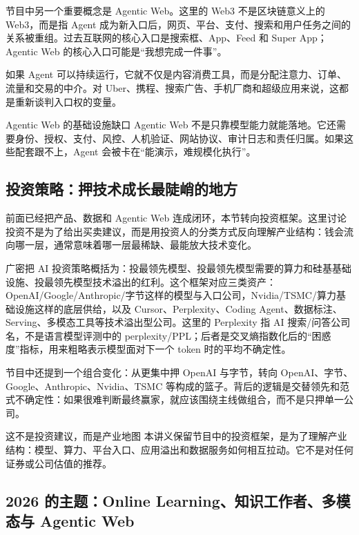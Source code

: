 节目中另一个重要概念是 Agentic Web。这里的 Web3 不是区块链意义上的 Web3，而是指 Agent 成为新入口后，网页、平台、支付、搜索和用户任务之间的关系被重组。过去互联网的核心入口是搜索框、App、Feed 和 Super App；Agentic Web 的核心入口可能是“我想完成一件事”。

如果 Agent 可以持续运行，它就不仅是内容消费工具，而是分配注意力、订单、流量和交易的中介。对 Uber、携程、搜索广告、手机厂商和超级应用来说，这都是重新谈判入口权的变量。

\begin{warningbox}{Agentic Web 的基础设施缺口}
Agentic Web 不是只靠模型能力就能落地。它还需要身份、授权、支付、风控、人机验证、网站协议、审计日志和责任归属。如果这些配套跟不上，Agent 会被卡在“能演示，难规模化执行”。
\end{warningbox}

\subsection{投资策略：押技术成长最陡峭的地方}

前面已经把产品、数据和 Agentic Web 连成闭环，本节转向投资框架。这里讨论投资不是为了给出买卖建议，而是用投资人的分类方式反向理解产业结构：钱会流向哪一层，通常意味着哪一层最稀缺、最能放大技术变化。

广密把 AI 投资策略概括为：投最领先模型、投最领先模型需要的算力和硅基基础设施、投最领先模型技术溢出的红利。这个框架对应三类资产：OpenAI/Google/Anthropic/字节这样的模型与入口公司，Nvidia/TSMC/算力基础设施这样的底层供给，以及 Cursor、Perplexity、Coding Agent、数据标注、Serving、多模态工具等技术溢出型公司。这里的 Perplexity 指 AI 搜索/问答公司名，不是语言模型评测中的 perplexity/PPL；后者是交叉熵指数化后的“困惑度”指标，用来粗略表示模型面对下一个 token 时的平均不确定性。

节目中还提到一个组合变化：从更集中押 OpenAI 与字节，转向 OpenAI、字节、Google、Anthropic、Nvidia、TSMC 等构成的篮子。背后的逻辑是交替领先和范式不确定性：如果很难判断最终赢家，就应该围绕主线做组合，而不是只押单一公司。

\begin{knowledgebox}{这不是投资建议，而是产业地图}
本讲义保留节目中的投资框架，是为了理解产业结构：模型、算力、平台入口、应用溢出和数据服务如何相互拉动。它不是对任何证券或公司估值的推荐。
\end{knowledgebox}

\subsection{2026 的主题：Online Learning、知识工作者、多模态与 Agentic Web}

